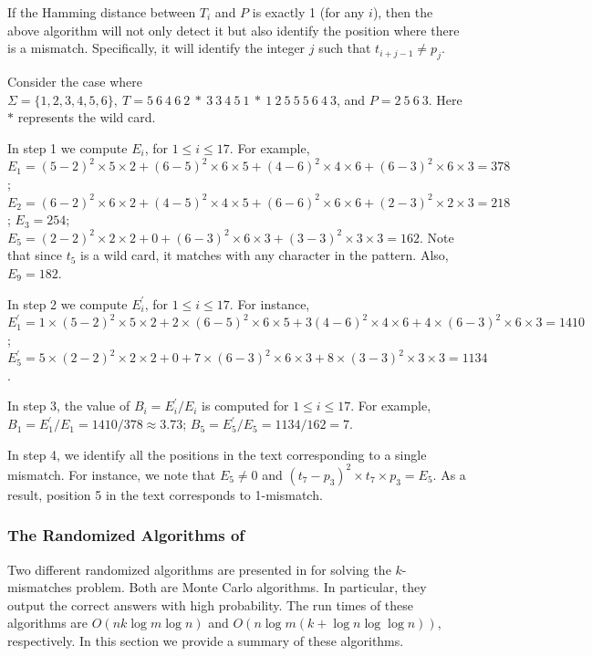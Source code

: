   If the Hamming distance between $T_i$ and $P$ is exactly
 1 (for any $i$), then the above algorithm will not only detect it but also
 identify the position where there is a mismatch. Specifically, it will
 identify the integer $j$ such that $t_{i+j-1}\neq p_j$.
 
 
  Consider the case where $\Sigma=\{1,2,3,4,5,6\},~T=5~6~4~6~2~*~3~3~4~5~1~*~1~2~5~5~5~6~4~3$, and $P=2~5~6~3$.
Here $*$ represents the wild card.
 
 In step 1 we compute $E_i$, for $1 \leq i \leq 17$. For example,
 $E_1=(5-2)^2\times 5\times 2+(6-5)^2\times 6\times 5+(4-6)^2\times 4 \times 6+(6-3)^2\times 6\times 3=378$; $E_2=(6-2)^2\times 6\times 2+(4-5)^2\times 4\times 5+(6-6)^2\times 6\times 6+(2-3)^2\times 2 \times 3=218$; $E_3=254$; $E_5=(2-2)^2\times 2\times 2+0+(6-3)^2\times 6\times 3+(3-3)^2\times 3\times 3=162$. Note that since $t_5$ is a wild card, it matches with any character in the pattern. Also, $E_9=182$.
 
 In step 2 we compute $E_i^\prime$, for $1\leq i\leq 17$. For instance, $E_1^\prime=1\times(5-2)^2\times 5\times 2+2\times(6-5)^2\times 6\times 5+3(4-6)^2\times 4\times 6+4\times(6-3)^2\times 6\times 3=1410$; $E_5^\prime=5\times(2-2)^2\times 2\times 2+0+7\times(6-3)^2\times 6\times 3+8\times(3-3)^2\times 3\times 3=1134$.
 
 In step 3, the value of $B_i=E_i^\prime/E_i$ is computed for $1\leq i\leq 17$. For example, $B_1=E_1^\prime/E_1=1410/378\approx 3.73$; $B_5=E_5^\prime/E_5=1134/162=7$. 
 
 In step 4, we identify all the positions in the text corresponding to a single mismatch. For instance, we note that $E_5\neq 0$ and $(t_7-p_3)^2\times t_7\times p_3=E_5$. As a result, position 5 in the text corresponds to 1-mismatch.

\subsubsection{The Randomized Algorithms of \cite{CEP+07}}
Two different randomized algorithms are presented in \cite{CEP+07} for solving
the $k$-mismatches problem. Both are Monte Carlo algorithms. In particular, they
output the correct answers with high probability. The run times of these
algorithms are $O(nk\log m\log n)$ and $O(n\log m(k+\log n\log\log n))$,
respectively. In this section we provide a summary of these algorithms.



